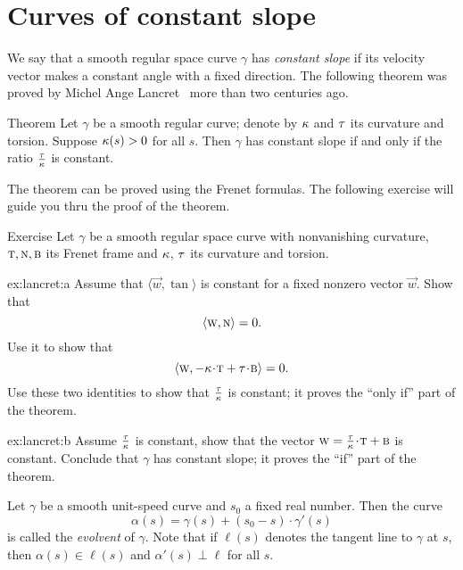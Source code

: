\section{Curves of constant slope}

We say that a smooth regular space curve $\gamma$ has \emph{constant slope} if its velocity vector makes a constant angle with a fixed direction.
The following theorem was proved by Michel Ange Lancret~\cite{lancret} more than two centuries ago.

\begin{thm}{Theorem}\label{thm:const-slope}
Let $\gamma$ be a smooth regular curve;
denote by $\kappa$ and $\tau$ its curvature and torsion.
Suppose $\kappa(s)>0$ for all $s$.
Then $\gamma$ has constant slope if and only if the ratio $\tfrac{\tau}{\kappa}$ is constant.
\end{thm}

The theorem can be proved using the Frenet formulas.
The following exercise will guide you thru the proof of the theorem. 

\begin{thm}{Exercise} \label{ex:lancret}
Let $\gamma$ be a smooth regular space curve with nonvanishing curvature, $\textsc{t},\textsc{n},\textsc{b}$ 
its Frenet frame and $\kappa$, $\tau$ its curvature and torsion.

\begin{subthm}{ex:lancret:a}
Assume that  $\langle \vec w,\tan\rangle$ is constant for a fixed nonzero vector $\vec w$.
Show that 
\[\langle \textsc w, \textsc{n}\rangle =0.\]
Use it to show that 
\[\langle \vec w, -\kur\cdot\tan+\tor\cdot \bi\rangle =0.\]
Use these two identities to show that $\tfrac{\tau}{\kappa}$ is constant;
it proves the ``only if'' part of the theorem.
\end{subthm}

\begin{subthm}{ex:lancret:b} Assume $\tfrac{\tau}{\kappa}$ is constant, show that the vector $\vec w=\tfrac\tor\kur\cdot \tan+\bi$ is constant.
Conclude that $\gamma$ has constant slope; it proves the ``if'' part of the theorem.
\end{subthm}

\end{thm}

Let $\gamma$ be a smooth unit-speed curve and $s_0$ a fixed real number. 
Then the curve 
\[\alpha(s)=\gamma(s)+(s_0-s)\cdot \gamma'(s)\]
is called the \emph{evolvent} of $\gamma$.
Note that if $\ell(s)$ denotes the tangent line to $\gamma$ at $s$,
then $\alpha(s)\in \ell(s)$ and $\alpha'(s)\perp \ell$ for all $s$.

